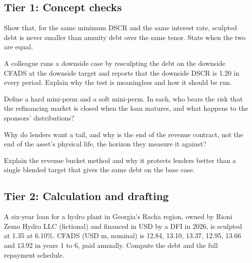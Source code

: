 \subsection*{Tier 1: Concept checks}

\begin{exercise}\label{exr:36.1}
Show that, for the same minimum DSCR and the same interest rate, sculpted debt is never smaller than annuity debt over the same tenor. State when the two are equal.
\end{exercise}

\begin{exercise}\label{exr:36.2}
A colleague runs a downside case by resculpting the debt on the downside CFADS at the downside target and reports that the downside DSCR is 1.20\x{} in every period. Explain why the test is meaningless and how it should be run.
\end{exercise}

\begin{exercise}\label{exr:36.3}
Define a hard mini-perm and a soft mini-perm. In each, who bears the risk that the refinancing market is closed when the loan matures, and what happens to the sponsors' distributions?
\end{exercise}

\begin{exercise}\label{exr:36.4}
Why do lenders want a tail, and why is the end of the revenue contract, not the end of the asset's physical life, the horizon they measure it against?
\end{exercise}

\begin{exercise}\label{exr:36.5}
Explain the revenue bucket method and why it protects lenders better than a single blended target that gives the same debt on the base case.
\end{exercise}

\subsection*{Tier 2: Calculation and drafting}

\begin{exercise}\label{exr:36.6}
A six-year loan for a hydro plant in Georgia's Racha region, owned by Rioni Zemo Hydro LLC (fictional) and financed in USD by a DFI in 2026, is sculpted at 1.35\x{} at 6.10\%. CFADS (USD m, nominal) is 12.84, 13.10, 13.37, 12.95, 13.66 and 13.92 in years 1 to 6, paid annually. Compute the debt and the full repayment schedule.
\end{exercise}

